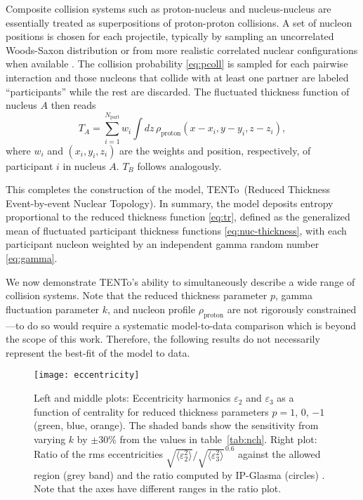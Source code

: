 \documentclass[aps,prc,reprint,amsmath]{revtex4-1}
\newcommand{\psec}[1]{\phantomsection\addcontentsline{toc}{section}{#1}}
\newcommand{\trento}{T\raisebox{-.5ex}{R}ENTo}
\newcommand{\eccratio}{\sqrt{\langle \varepsilon_2^2 \rangle}/\sqrt{\langle \varepsilon_3^2 \rangle}^{\,0.6}}
\begin{document}
Composite collision systems such as proton-nucleus and nucleus-nucleus are essentially treated as
superpositions of proton-proton collisions.
A set of nucleon positions is chosen for each projectile, typically by sampling an uncorrelated Woods-Saxon distribution or from more realistic correlated nuclear configurations when available \cite{Alvioli:2009ab}.
The collision probability \eqref{eq:pcoll} is sampled for each pairwise interaction and those nucleons that collide with at least one partner are labeled ``participants'' while the rest are discarded.
The fluctuated thickness function of nucleus $A$ then reads
\begin{equation}
  T_A = \sum_{i=1}^{N_\text{part}} w_i \int dz \, \rho_\text{proton}(x - x_i, y - y_i, z - z_i),
  \label{eq:nuc-thickness}
\end{equation}
where $w_i$ and $(x_i, y_i, z_i)$ are the weights and position, respectively, of participant $i$ in nucleus $A$.
$T_B$ follows analogously.

This completes the construction of the model, \trento\ (Reduced Thickness Event-by-event Nuclear Topology).
In summary, the model deposits entropy proportional to the reduced thickness function \eqref{eq:tr}, defined as the generalized mean of fluctuated participant thickness functions \eqref{eq:nuc-thickness}, with each participant nucleon weighted by an independent gamma random number \eqref{eq:gamma}.

\psec{Applications}

We now demonstrate \trento's ability to simultaneously describe a wide range of collision systems.
Note that the reduced thickness parameter $p$, gamma fluctuation parameter $k$, and nucleon profile $\rho_\text{proton}$ are not rigorously constrained---to do so would require a systematic model-to-data comparison \cite{Bernhard:2015hxa} which is beyond the scope of this work.
Therefore, the following results do not necessarily represent the best-fit of the model to data.

\begin{figure*}[t]
  \texttt{[image: eccentricity]}
  \caption{
    \label{fig:eccen}
    Left and middle plots:
    Eccentricity harmonics $\varepsilon_2$ and $\varepsilon_3$ as a function of centrality for reduced thickness parameters $p = 1$, 0, $-1$ (green, blue, orange).
    The shaded bands show the sensitivity from varying $k$ by $\pm30\%$ from the values in table~\ref{tab:nch}.
    Right plot:
    Ratio of the rms eccentricities $\eccratio$ against the allowed region (grey band) and the ratio computed by IP-Glasma (circles) \cite{Retinskaya:2013gca}.
    Note that the axes have different ranges in the ratio plot.
  }
\end{figure*}
\end{document}

